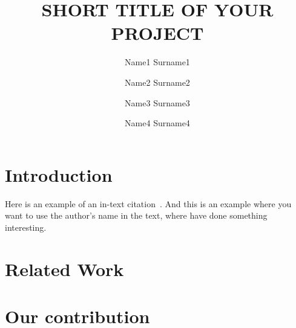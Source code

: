 


\title{SHORT TITLE OF YOUR PROJECT}

\author{
    \small Name1 Surname1 \and
    \small Name2 Surname2 \and
    \small Name3 Surname3 \and
    \small Name4 Surname4
    }





\maketitle




\section{Introduction}
\lipsum[1]

Here is an example of an in-text
citation~\citep{silva-rodriguez_conformal_2025}. And this is an example where
you want to use the author's name in the text, where \citet{fillioux_are_2025}
have done something interesting.


\section{Related Work}
\lipsum[3]

\section{Our contribution}
\lipsum[4][1-15]

